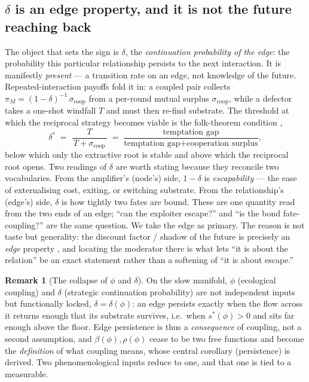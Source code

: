 \documentclass[11pt]{article}
\theoremstyle{plain}
\theoremstyle{definition}
\newtheorem{remark}{Remark}
\begin{document}
\subsection{$\delta$ is an edge property, and it is not the future reaching back}

The object that sets the sign is $\delta$, the \emph{continuation probability of the edge}: the probability this particular relationship persists to the next interaction. It is manifestly \emph{present} --- a transition rate on an edge, not knowledge of the future. Repeated-interaction payoffs fold it in: a coupled pair collects $\pi_{M} = (1-\delta)^{-1}\,\sigma_{\text{coop}}$ from a per-round mutual surplus $\sigma_{\text{coop}}$, while a defector takes a one-shot windfall $T$ and must then re-find substrate. The threshold at which the reciprocal strategy becomes viable is the folk-theorem condition \cite{axelrod1984,nowak2006},
\begin{equation}
\delta^\ast \;=\; \frac{T}{\,T + \sigma_{\text{coop}}\,}
\;=\; \frac{\text{temptation gap}}{\text{temptation gap} + \text{cooperation surplus}} ,
\label{eq:folk}
\end{equation}
below which only the extractive root is stable and above which the reciprocal root opens. Two readings of $\delta$ are worth stating because they reconcile two vocabularies. From the amplifier's (node's) side, $1 - \delta$ is \emph{escapability} --- the ease of externalising cost, exiting, or switching substrate. From the relationship's (edge's) side, $\delta$ is how tightly two fates are bound. These are one quantity read from the two ends of an edge; ``can the exploiter escape?'' and ``is the bond fate-coupling?'' are the same question. We take the edge as primary. The reason is not taste but generality: the discount factor / shadow of the future is precisely an \emph{edge} property \cite{axelrod1984}, and locating the moderator there is what lets ``it is about the relation'' be an exact statement rather than a softening of ``it is about escape.''

\begin{remark}[The collapse of $\phi$ and $\delta$]
On the slow manifold, $\phi$ (ecological coupling) and $\delta$ (strategic continuation probability) are not independent inputs but functionally locked, $\delta = \delta(\phi)$: an edge persists exactly when the flow across it returns enough that its substrate survives, i.e.\ when $s^\ast(\phi) > 0$ and sits far enough above the floor. Edge persistence is thus a \emph{consequence} of coupling, not a second assumption, and $\beta(\phi),\rho(\phi)$ cease to be two free functions and become the \emph{definition} of what coupling means, whose central corollary (persistence) is derived. Two phenomenological inputs reduce to one, and that one is tied to a measurable.
\end{remark}
\end{document}
